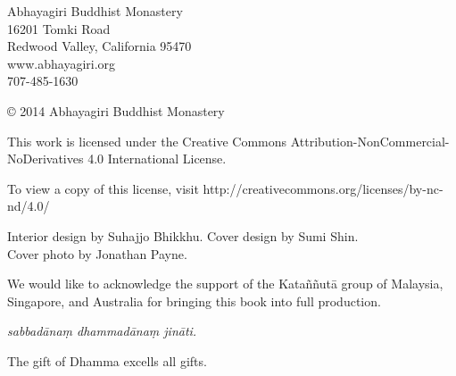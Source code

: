 \thispagestyle{empty}
{\footnotesize\raggedright
{}

\vspace{1em}
Abhayagiri Buddhist Monastery\\
16201 Tomki Road\\
Redwood Valley, California 95470\\
www.abhayagiri.org\\
707-485-1630

\vspace{1em}
\copyright{} 2014 Abhayagiri Buddhist Monastery

\vspace{1em}
This work is licensed under the Creative Commons
Attribution-NonCommercial-NoDerivatives 4.0 International License.

To view a copy of this license, visit
http://creativecommons.org/licenses/by-nc-nd/4.0/

\vspace{1em}

Interior design by Suhajjo Bhikkhu. Cover design by Sumi Shin.\\
Cover photo by Jonathan Payne. 


\vspace{1em}

We would like to acknowledge the support of the Kataññutā group of
Malaysia, Singapore, and Australia for bringing this book into full
production.

\vspace{1em}

\textit{sabbadānaṃ dhammadānaṃ jināti.}

The gift of Dhamma excells all gifts.
}

\clearpage
